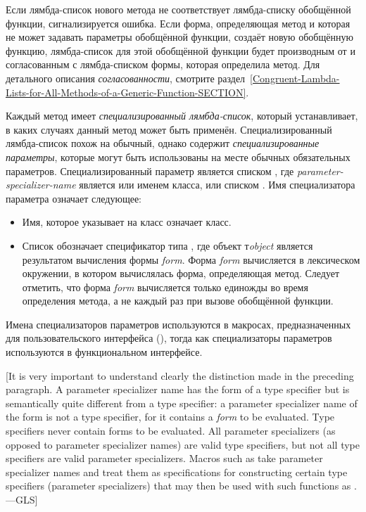 Если лямбда-список нового метода не соответствует лямбда-списку обобщённой
функции, сигнализируется ошибка. Если форма, определяющая метод и которая не
может задавать параметры обобщённой функции, создаёт новую обобщённую функцию,
лямбда-список для этой обобщённой функции будет производным от и согласованным с
лямбда-списком формы, которая определила метод. Для детального описания
\emph{согласованности}, смотрите
раздел~\ref{Congruent-Lambda-Lists-for-All-Methods-of-a-Generic-Function-SECTION}.

Каждый метод имеет \emph{специализированный лямбда-список}, который
устанавливает, в каких случаях данный метод может быть
применён. Специализированный лямбда-список похож на обычный, однако содержит
\emph{специализированные параметры}, которые могут быть использованы на месте
обычных обязательных параметров. Специализированный параметр является списком
, где
\emph{parameter-specializer-name} является или именем класса, или списком
.
Имя специализатора параметра означает следующее:

\begin{itemize}
\item Имя, которое указывает на класс означает класс.

\item Список  обозначает спецификатор типа
  , где объект т\emph{object} является результатом
  вычисления формы \emph{form}. Форма \emph{form} вычисляется в лексическом
  окружении, в котором вычислялась форма, определяющая метод. Следует отметить,
  что форма \emph{form} вычисляется только единожды во время определения метода,
  а не каждый раз при вызове обобщённой функции.
\end{itemize}

Имена специализаторов параметров используются в макросах, предназначенных для
пользовательского интерфейса (), тогда как специализаторы
параметров используются в функциональном интерфейсе.

[It is very important to understand clearly the distinction made
in the preceding paragraph.  A parameter specializer name
has the form of a type specifier but is semantically quite different
from a type specifier: a parameter specializer name of the form
 is not a type specifier, for it contains
a \emph{form} to be evaluated.   Type specifiers
never contain forms to be evaluated.  All parameter specializers
(as opposed to parameter specializer names) are valid type specifiers,
but not all type specifiers are valid parameter specializers.  Macros such as 
take parameter specializer names and treat them as specifications for
constructing certain type specifiers (parameter specializers) that may then be used
with such functions as .---GLS]

